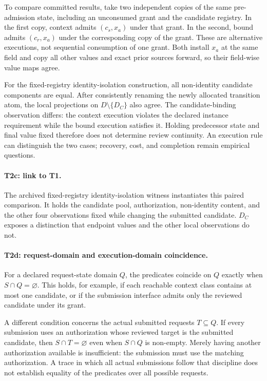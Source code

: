 To compare committed results, take two independent copies of the same pre-admission state, including an unconsumed grant and the candidate registry. In the first copy, context admits $(c_s,x_a)$ under that grant. In the second, bound admits $(c_r,x_a)$ under the corresponding copy of the grant. These are alternative executions, not sequential consumption of one grant. Both install $x_a$ at the same field and copy all other values and exact prior sources forward, so their field-wise value maps agree.

For the fixed-registry identity-isolation construction, all non-identity candidate components are equal. After consistently renaming the newly allocated transition atom, the local projections on $D\setminus\{D_C\}$ also agree. The candidate-binding observation differs: the context execution violates the declared instance requirement while the bound execution satisfies it. Holding predecessor state and final value fixed therefore does not determine review continuity. An execution rule can distinguish the two cases; recovery, cost, and completion remain empirical questions.

\paragraph{T2c: link to T1.}
The archived fixed-registry identity-isolation witness instantiates this paired comparison. It holds the candidate pool, authorization, non-identity content, and the other four observations fixed while changing the submitted candidate. $D_C$ exposes a distinction that endpoint values and the other local observations do not.

\paragraph{T2d: request-domain and execution-domain coincidence.}
For a declared request-state domain $Q$, the predicates coincide on $Q$ exactly when $S\cap Q=\varnothing$. This holds, for example, if each reachable context class contains at most one candidate, or if the submission interface admits only the reviewed candidate under its grant.

A different condition concerns the actual submitted requests $T\subseteq Q$. If every submission uses an authorization whose reviewed target is the submitted candidate, then $S\cap T=\varnothing$ even when $S\cap Q$ is non-empty. Merely having another authorization available is insufficient: the submission must use the matching authorization. A trace in which all actual submissions follow that discipline does not establish equality of the predicates over all possible requests.

